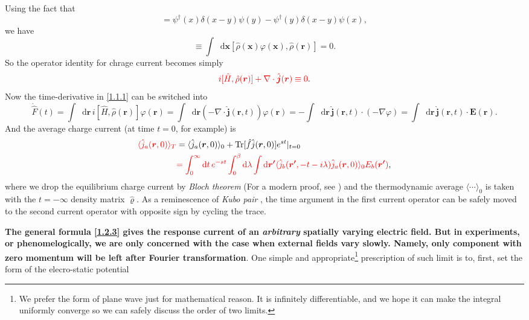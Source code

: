 \documentclass[10pt,nofootinbib,letterpaper]{revtex4}
\newcommand*\dd{\mathop{}\!\mathrm{d}}
\begin{document}
\fi
		\noindent Using the fact that
		\begin{equation*}
			[\hat\rho(x),\hat\rho(y)]=\psi^\dagger(x)\delta(x-y)\psi(y)-\psi^\dagger(y)\delta(x-y)\psi(x),
		\end{equation*}
		we have
		\begin{equation*}
			[\hat F,\hat\rho(\bm{r})]\equiv\int\dd\bm{x}[\hat{\rho}(\bm{x})\varphi(\bm{x}),\hat\rho(\bm{r})]=0.
		\end{equation*}
		So the operator identity for chrage current becomes simply
		\begin{equation}\label{1.2.2}
			{\color{red}i[\hat H,\hat\rho(\bm{r})]+\nabla\cdot\hat{\bm{j}}(\bm{r})\equiv0}.
		\end{equation}
		\indent Now the time-derivative in \eqref{1.1.1} can be switched into
		\begin{equation*}
			\dot{\hat F}(t)=\int\dd\bm{r}\,i[\hat H,\hat\rho(\bm{r})]\varphi(\bm{r})=\int\dd\bm{r}(-\nabla\cdot\hat{\bm{j}}(\bm{r},t))\varphi(\bm{r})=-\int\dd\bm{r}\,\hat{\bm{j}}(\bm{r},t)\cdot(-\nabla\varphi)=\int\dd\bm{r}\,\hat{\bm{j}}(\bm{r},t)\cdot\bm{E}(\bm{r}).
		\end{equation*}
		And the average charge current (at time $t=0$, for example) is
		\begin{align}
			{\color{red}\langle\hat j_a(\bm{r},0)\rangle_T}&=\langle\hat j_a(\bm{r},0)\rangle_0+\mathrm{Tr}[\hat{f}\hat j(\bm{r},0)]e^{st}|_{t=0}\nonumber\\
			&{\color{red}=\int_0^\infty\dd t\,e^{-st}\int_0^\beta\dd\lambda\int\dd\bm{r'}\langle\hat j_b(\bm{r'},-t-i\lambda)\hat j_a(\bm{r},0)\rangle_0 E_b(\bm{r'})},\label{1.2.3}
		\end{align}
		where we drop the equilibrium charge current by \emph{Bloch theorem} (For a modern proof, see \cite{watanabe2019proof}) and the thermodynamic average $\langle\cdots\rangle_0$ is taken with the $t=-\infty$ density matrix $\hat{\varrho}$. As a reminescence of \emph{Kubo pair} \cite{kubo1957statistical}, the time argument in the first current operator can be safely moved to the second current operator with opposite sign by cycling the trace.\par
		\textbf{The general formula \eqref{1.2.3} gives the response current of an \emph{arbitrary} spatially varying electric field. But in experiments, or phenomelogically, we are only concerned with the case when external fields vary slowly. Namely, only component with zero momentum will be left after Fourier transformation}. One simple and appropriate\footnote{We prefer the form of plane wave just for mathematical reason. It is infinitely differentiable, and we hope it can make the integral uniformly converge so we can safely discuss the order of two limits.} prescription of such limit is to, first, set the form of the elecro-static potential
\end{document}
